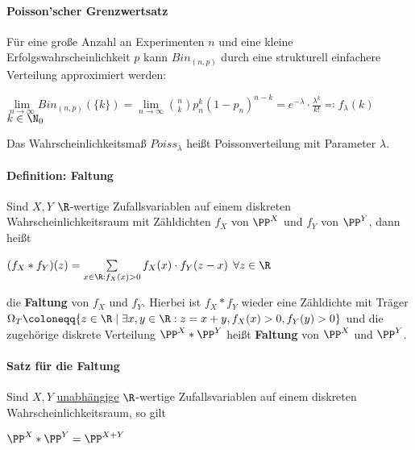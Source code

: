 \paragraph{Poisson'scher Grenzwertsatz}
Für eine große Anzahl an Experimenten $n$ und eine kleine Erfolgswahrscheinlichkeit $p$ kann $Bin_{(n,p)}$ durch eine strukturell einfachere Verteilung approximiert werden:
\begin{tightcenter}
	$\lim\limits_{n\rightarrow\infty}Bin_{(n,p)}(\{k\})=\lim\limits_{n\rightarrow\infty}\binom{n}{k}p_n^k(1-p_n)^{n-k}=e^{-\lambda}\cdot\frac{\lambda^k}{k!}\eqqcolon f_\lambda(k)$ \qquad$k\in\N_0$
\end{tightcenter}
Das Wahrscheinlichkeitsmaß $Poiss_\lambda$ heißt Poissonverteilung mit Parameter $\lambda$.

\paragraph{Definition: Faltung}
Sind $X,Y$ $\R$-wertige Zufallsvariablen auf einem diskreten Wahrscheinlichkeitsraum mit Zähldichten $f_X$ von $\PP^X$ und $f_Y$ von $\PP^Y$, dann heißt
\begin{tightcenter}
	$(f_X*f_Y)(z)=\sum\limits_{x\in\R:f_X(x)>0}f_X(x)\cdot f_Y(z-x)$ \qquad$\forall z\in\R$
\end{tightcenter}
die \textbf{Faltung} von $f_X$ und $f_Y$.
Hierbei ist $f_X*f_Y$ wieder eine Zähldichte mit Träger $\Omega_T\coloneqq\{z\in\R\mid\exists x,y\in\R:z=x+y,f_X(x)>0, f_Y(y)>0\}$ und die zugehörige diskrete Verteilung $\PP^X*\PP^Y$ heißt \textbf{Faltung} von $\PP^X$ und $\PP^Y$.

\paragraph{Satz für die Faltung}
Sind $X,Y$ \underline{unabhängige} $\R$-wertige Zufallsvariablen auf einem diskreten Wahrscheinlichkeitsraum, so gilt
\begin{tightcenter}
	$\PP^X*\PP^Y=\PP^{X+Y}$
\end{tightcenter}